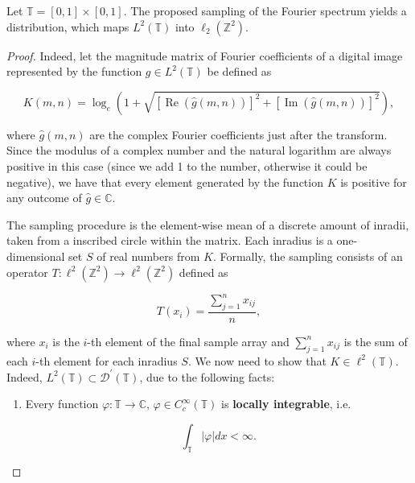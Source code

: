 \begin{theorem}{3}

Let $\mathbb{T} = [0,1] \times [0,1]$. The proposed sampling of the Fourier spectrum yields a distribution, which maps $L^{2}(\mathbb{T})$ into $\ell_{2}(\mathbb{Z}^{2})$.

\begin{proof}

Indeed, let the magnitude matrix of Fourier coefficients of a digital image represented by the function $g \in L^{2}(\mathbb{T})$ be defined as

\[
    K(m,n) = 
        \log_{e}{\left(1
        + \sqrt{
            [\operatorname{Re}{(\hat{g}(m,n))}]^{2}
            + [\operatorname{Im}{(\hat{g}(m,n))}]^{2}
          }
        \right)},
\]

\vspace{0.1in}

\noindent where $\hat{g}(m,n)$ are the complex Fourier coefficients just after the transform. Since the modulus of a complex number and the natural logarithm are always positive in this case (since we add 1 to the number, otherwise it could be negative), we have that every element generated by the function $K$ is positive for any outcome of $\hat{g} \in \mathbb{C}$.

The sampling procedure is the element-wise mean of a discrete amount of inradii, taken from a inscribed circle within the matrix. Each inradius is a one-dimensional set $S$ of real numbers from $K$. Formally, the sampling consists of an operator $T : \ell^{2}(\mathbb{Z}^{2}) \rightarrow \ell^{2}(\mathbb{Z}^{2})$ defined as 

\[
    T(x_{i}) = \frac{\sum_{j=1}^{n}x_{ij}}{n},
\]

\vspace{0.1in}

\noindent where $x_{i}$ is the $i$-th element of the final sample array and $\sum_{j=1}^{n}x_{ij}$ is the sum of each $i$-th element for each inradius $S$. We now need to show that $K \in \ell^{2}(\mathbb{T})$. Indeed, $L^{2}(\mathbb{T}) \subset \mathcal{D}^{'}(\mathbb{T})$, due to the following facts:

\begin{enumerate}[label=(\roman*)]
    \item Every function $\varphi : \mathbb{T} \rightarrow \mathbb{C}$, $\varphi \in C_ {c}^{\infty}(\mathbb{T})$ is \textbf{locally integrable}, i.e.
    
    \[ \int_{\mathbb{T}} |\varphi|dx < \infty. \]
    

\end{enumerate}
\end{proof}
\end{theorem}
